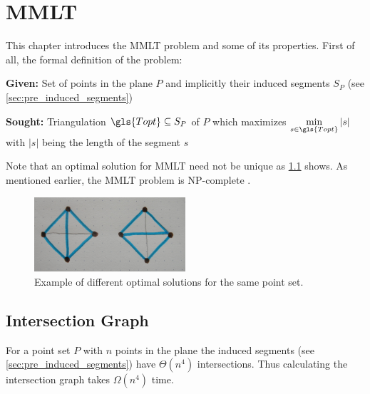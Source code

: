 \chapter{\glsdesc{MMLT}}

This chapter introduces the \gls{MMLT} problem and
some of its properties. First of all, the formal definition
of the problem:

\begin{problem}
  \hfill
  \begin{labeling}{\hspace{4em}}
    \item[\textbf{Given:}]
      Set of points in the plane \(P\) and implicitly their induced segments
      \(S_P\) (see \cref{sec:pre_induced_segments})
    \item[\textbf{Sought:}]
      Triangulation \(\gls{Topt}\subseteq S_P\) of \(P\) which maximizes
      \(\min\limits_{s\in \gls{Topt}} |s|\) 
      with \(|s|\) being the length of the segment \(s\)
  \end{labeling}
\end{problem}

Note that an optimal solution for \gls{MMLT} need not be unique as
\cref{fig:non_unique_optimal} shows. As mentioned earlier, the
\gls{MMLT} problem is NP-complete \cite{mmlt_complexity}.

\begin{figure}[ht]
  \centering
  \includegraphics[width=0.5\textwidth]{img/non_unique_optimal.jpg}
  \caption{Example of different optimal solutions for the same point set.\label{fig:non_unique_optimal}}
\end{figure}




\section{Intersection Graph}\label{sec:pre_intersection_graph}
For a point set \(P\) with \(n\) points in the plane 
the induced segments (see
\cref{sec:pre_induced_segments}) have \(\Theta(n^4)\) intersections.
\cite{quadrilaterals_bound} Thus calculating the intersection graph
takes \(\Omega(n^4)\) time.

